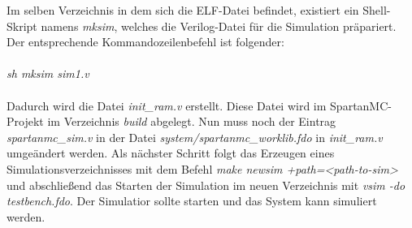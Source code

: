 Im selben Verzeichnis in dem sich die ELF-Datei befindet, existiert ein Shell-Skript namens \textit{mksim}, welches die Verilog-Datei für die Simulation präpariert. Der entsprechende Kommandozeilenbefehl ist folgender:\\\\
\indent \textit{sh mksim sim1.v}\\\\
Dadurch wird die Datei \textit{init\_ram.v} erstellt. Diese Datei wird im SpartanMC-Projekt im Verzeichnis \textit{build} abgelegt. Nun muss noch der Eintrag \textit{spartanmc\_sim.v} in der Datei \textit{system/spartanmc\_worklib.fdo} in \textit{init\_ram.v} umgeändert werden. Als nächster Schritt folgt das Erzeugen eines Simulationsverzeichnisses mit dem Befehl \textit{make newsim +path=<path-to-sim>} und abschließend das Starten der Simulation im neuen Verzeichnis mit \textit{vsim -do testbench.fdo}. Der Simulatior sollte starten und das System kann simuliert werden. 